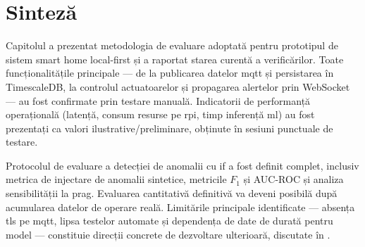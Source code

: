 \section{Sinteză}
\label{sec:sinteza-rezultate}

Capitolul a prezentat metodologia de evaluare adoptată pentru prototipul de sistem smart home
local-first și a raportat starea curentă a verificărilor. Toate funcționalitățile principale
— de la publicarea datelor \gls{mqtt} și persistarea în TimescaleDB, la controlul actuatoarelor
și propagarea alertelor prin WebSocket — au fost confirmate prin testare manuală. Indicatorii
de performanță operațională (latență, consum resurse pe \gls{rpi}, timp inferență \gls{ml})
au fost prezentați ca valori ilustrative/preliminare, obținute în sesiuni punctuale de testare.

Protocolul de evaluare a detecției de anomalii cu \gls{if} a fost definit complet, inclusiv
metrica de injectare de anomalii sintetice, metricile $F_1$ și AUC-ROC și analiza sensibilității
la prag. Evaluarea cantitativă definitivă va deveni posibilă după acumularea datelor de operare
reală. Limitările principale identificate — absența \gls{tls} pe \gls{mqtt}, lipsa testelor
automate și dependența de date de durată pentru model — constituie direcții concrete de
dezvoltare ulterioară, discutate în .
